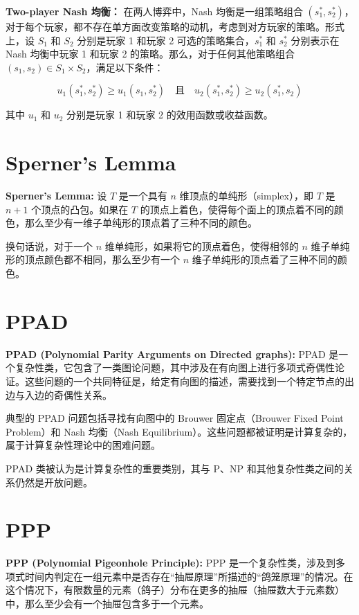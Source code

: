 \documentclass{article}
\begin{document}
\textbf{Two-player Nash 均衡：} 在两人博弈中，Nash 均衡是一组策略组合 \((s_1^*, s_2^*)\)，对于每个玩家，都不存在单方面改变策略的动机，考虑到对方玩家的策略。形式上，设 \(S_1\) 和 \(S_2\) 分别是玩家 1 和玩家 2 可选的策略集合，\(s_1^*\) 和 \(s_2^*\) 分别表示在 Nash 均衡中玩家 1 和玩家 2 的策略。那么，对于任何其他策略组合 \((s_1, s_2) \in S_1 \times S_2\)，满足以下条件：

\[
    u_1(s_1^*, s_2^*) \geq u_1(s_1, s_2^*) \quad \text{且} \quad u_2(s_1^*, s_2^*) \geq u_2(s_1^*, s_2)
\]

其中 \(u_1\) 和 \(u_2\) 分别是玩家 1 和玩家 2 的效用函数或收益函数。

\section{Sperner's Lemma}

\textbf{Sperner's Lemma:} 设 \(T\) 是一个具有 \(n\) 维顶点的单纯形（simplex），即 \(T\) 是 \(n+1\) 个顶点的凸包。如果在 \(T\) 的顶点上着色，使得每个面上的顶点着不同的颜色，那么至少有一维子单纯形的顶点着了三种不同的颜色。

换句话说，对于一个 \(n\) 维单纯形，如果将它的顶点着色，使得相邻的 \(n\) 维子单纯形的顶点颜色都不相同，那么至少有一个 \(n\) 维子单纯形的顶点着了三种不同的颜色。

\section{PPAD}

\textbf{PPAD (Polynomial Parity Arguments on Directed graphs):} PPAD 是一个复杂性类，它包含了一类图论问题，其中涉及在有向图上进行多项式奇偶性论证。这些问题的一个共同特征是，给定有向图的描述，需要找到一个特定节点的出边与入边的奇偶性关系。

典型的 PPAD 问题包括寻找有向图中的 Brouwer 固定点（Brouwer Fixed Point Problem）和 Nash 均衡（Nash Equilibrium）。这些问题都被证明是计算复杂的，属于计算复杂性理论中的困难问题。

PPAD 类被认为是计算复杂性的重要类别，其与 P、NP 和其他复杂性类之间的关系仍然是开放问题。


\section{PPP}

\textbf{PPP (Polynomial Pigeonhole Principle):} PPP 是一个复杂性类，涉及到多项式时间内判定在一组元素中是否存在“抽屉原理”所描述的“鸽笼原理”的情况。在这个情况下，有限数量的元素（鸽子）分布在更多的抽屉（抽屉数大于元素数）中，那么至少会有一个抽屉包含多于一个元素。
\end{document}
